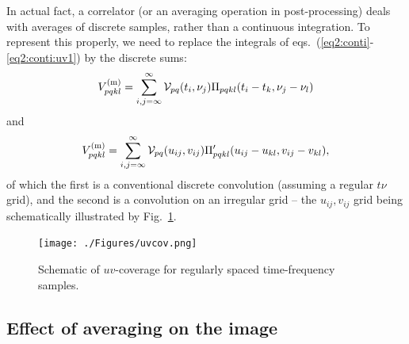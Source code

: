 \documentclass[useAMS,usenatbib]{mn2e}
\begin{document}
In actual fact, a correlator (or an averaging operation in post-processing) deals with averages of discrete 
samples, rather than a continuous integration. To represent this properly, we need to replace the integrals of 
eqs.~(\ref{eq2:conti}-\ref{eq2:conti:uv1}) by the discrete sums:
\begin{equation}
\label{eq:discrete:tf}
V^\mathrm{(m)}_{pqkl} = \sum_{i,j=\infty}^{\infty}  \mathcal{V}_{pq}(t_i,\nu_j) \Pi_{pqkl}(t_i-t_k,\nu_j-\nu_l)
\end{equation}
and
\begin{equation}
\label{eq:discrete:uv}
V^\mathrm{(m)}_{pqkl} = \sum_{i,j=\infty}^{\infty}  \mathcal{V}_{pq}(u_{ij},v_{ij}) \Pi^\prime_{pqkl}(u_{ij}-u_{kl},v_{ij}-v_{kl}),
\end{equation}
of which the first is a conventional discrete convolution (assuming a regular $t\nu$ grid), and the second is a convolution 
on an irregular grid -- the $u_{ij},v_{ij}$ grid being schematically illustrated by Fig.~\ref{fig:uvcov}.

\begin{figure}
\texttt{[image: ./Figures/uvcov.png]}\caption{Schematic of $uv$-coverage for 
regularly spaced time-frequency samples.}\label{fig:uvcov}
\end{figure}


\subsection{Effect of averaging on the image}
\label{sec:effectbw}
\end{document}
